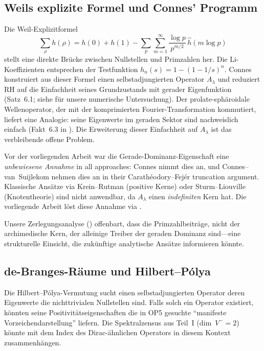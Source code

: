 \documentclass[12pt,a4paper]{article}
\theoremstyle{definition}
\theoremstyle{remark}
\begin{document}
\subsection{Weils explizite Formel und Connes' Programm}
Die Weil-Explizitformel
\[ \sum_\rho h(\rho) = h(0) + h(1) - \sum_p \sum_{m=1}^\infty \frac{\log p}{p^{m/2}}\,\hat{h}(m\log p) \]
stellt eine direkte Brücke zwischen Nullstellen und Primzahlen her. Die Li-Koeffizienten entsprechen der Testfunktion $h_n(s) = 1-(1-1/s)^n$. Connes \cite{Connes2025} konstruiert aus dieser Formel einen selbstadjungierten Operator $A_\lambda$ und reduziert RH auf die Einfachheit seines Grundzustands mit gerader Eigenfunktion (Satz~6.1; siehe  für unsere numerische Untersuchung). Der prolate-sphäroidale Wellenoperator, der mit der komprimierten Fourier-Transformation kommutiert, liefert eine Analogie: seine Eigenwerte im geraden Sektor sind nachweislich einfach (Fakt~6.3 in \cite{Connes2025}). Die Erweiterung dieser Einfachheit auf $A_\lambda$ ist das verbleibende offene Problem.

Vor der vorliegenden Arbeit war die Gerade-Dominanz-Eigenschaft eine \emph{unbewiesene Annahme} in all approaches: Connes \cite{Connes2025} nimmt dies an, und Connes--van~Suijlekom \cite{ConnesvS2025} nehmen dies an in their Carath\'eodory--Fej\'er truncation argument. Klassische Ansätze via Krein--Rutman (positive Kerne) oder Sturm--Liouville (Knotentheorie) sind nicht anwendbar, da $A_\lambda$ einen \emph{indefiniten} Kern hat. Die vorliegende Arbeit löst diese Annahme via .

Unsere Zerlegungsanalyse () offenbart, dass die Primzahlbeiträge, nicht der archimedische Kern, der alleinige Treiber der geraden Dominanz sind---eine strukturelle Einsicht, die zukünftige analytische Ansätze informieren könnte.

\subsection{de-Branges-R\"aume und Hilbert--P\'olya}
Die Hilbert--Pólya-Vermutung sucht einen selbstadjungierten Operator deren Eigenwerte die nichttrivialen Nullstellen sind. Falls solch ein Operator existiert, könnten seine Positivitätseigenschaften die in OP5 gesuchte ``manifeste Vorzeichendarstellung'' liefern. Die Spektralzensus aus Teil~I (dim~$V^- = 2$) könnte mit dem Index des Dirac-ähnlichen Operators in diesem Kontext zusammenhängen.


\end{document}
